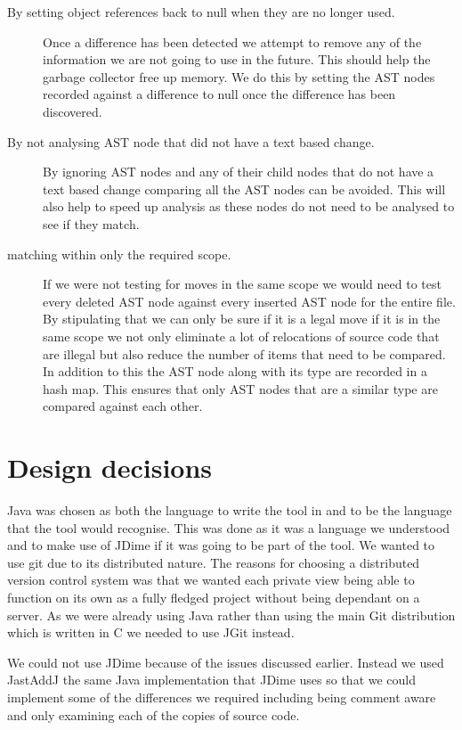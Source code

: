 \begin{description}
 \item [By setting object references back to null when they are no longer used.]
  Once a difference has been detected we attempt to remove any of the information we are not going to use in the future.  This should help the garbage collector free up memory. We do this by setting the AST nodes recorded against a difference to null once the difference has been discovered. 
\item [By not analysing AST node that did not have a text based change.] 
  By ignoring AST nodes and any of their child nodes that do not have a text based change comparing all the AST nodes can be avoided.  This will also help to speed up analysis as these nodes do not need to be analysed to see if they match.
\item [matching within only the required scope.]
  If we were not testing for moves in the same scope we would need to test every deleted AST node against every inserted AST node for the entire file. By stipulating that we can only be sure if it is a legal move if it is in the same scope we not only eliminate a lot of relocations of source code that are illegal but also reduce the number of items that need to be compared. In addition to this the AST node along with its type are recorded in a hash map.  This ensures that only AST nodes that are a similar type are compared against each other.
\end{description}


\section{Design decisions}
Java was chosen as both the language to write the tool in and to be the language that the tool would recognise.  This was done as it was a language we understood and to make use of JDime if it was going to be part of the tool.  We wanted to use git due to its distributed nature.  The reasons for choosing a distributed version control system was that we wanted each private view being able to function on its own as a fully fledged project without being dependant on a server.  As we were already using Java rather than using the main Git distribution which is written in C we needed to use JGit instead.

We could not use JDime because of the issues discussed earlier. Instead we used JastAddJ the same Java implementation that JDime uses so that we could implement some of the differences we required including being comment aware and only examining each of the copies of source code.

